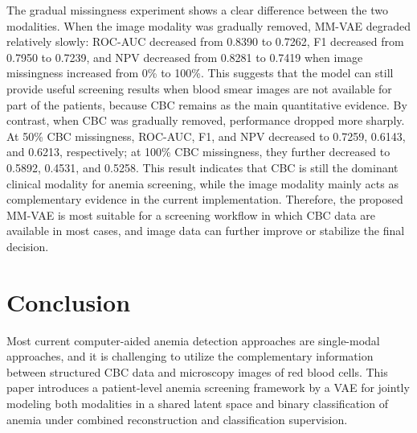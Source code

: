 \documentclass[conference]{IEEEtran}
\begin{document}
The gradual missingness experiment shows a clear difference between the two modalities. When the image modality was gradually removed, MM-VAE degraded relatively slowly: ROC-AUC decreased from 0.8390 to 0.7262, F1 decreased from 0.7950 to 0.7239, and NPV decreased from 0.8281 to 0.7419 when image missingness increased from 0\% to 100\%. This suggests that the model can still provide useful screening results when blood smear images are not available for part of the patients, because CBC remains as the main quantitative evidence. By contrast, when CBC was gradually removed, performance dropped more sharply. At 50\% CBC missingness, ROC-AUC, F1, and NPV decreased to 0.7259, 0.6143, and 0.6213, respectively; at 100\% CBC missingness, they further decreased to 0.5892, 0.4531, and 0.5258. This result indicates that CBC is still the dominant clinical modality for anemia screening, while the image modality mainly acts as complementary evidence in the current implementation. Therefore, the proposed MM-VAE is most suitable for a screening workflow in which CBC data are available in most cases, and image data can further improve or stabilize the final decision.

\FloatBarrier

\section{Conclusion}

Most current computer-aided anemia detection approaches are single-modal approaches, and it is challenging to utilize the complementary information between structured CBC data and microscopy images of red blood cells. This paper introduces a patient-level anemia screening framework by a VAE for jointly modeling both modalities in a shared latent space and binary classification of anemia under combined reconstruction and classification supervision.
\end{document}
